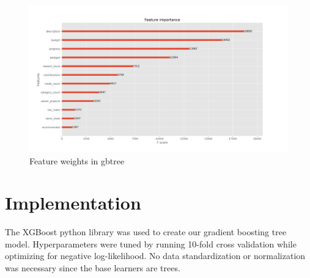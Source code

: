 \documentclass[cic,tc,english]{iiufrgs}
\begin{document}
\begin{figure}
    \caption{Feature weights in gbtree}
    \begin{center}
        \includegraphics[width=35em]{featureweights}
    \end{center}
    \label{fig:features}
\end{figure}


\chapter{Implementation}
The XGBoost python library was used to create our gradient boosting tree model. Hyperparameters were tuned by running 10-fold cross validation while optimizing for negative log-likelihood. No data standardization or normalization was necessary since the base learners are trees.



% 


{}
\end{document}
